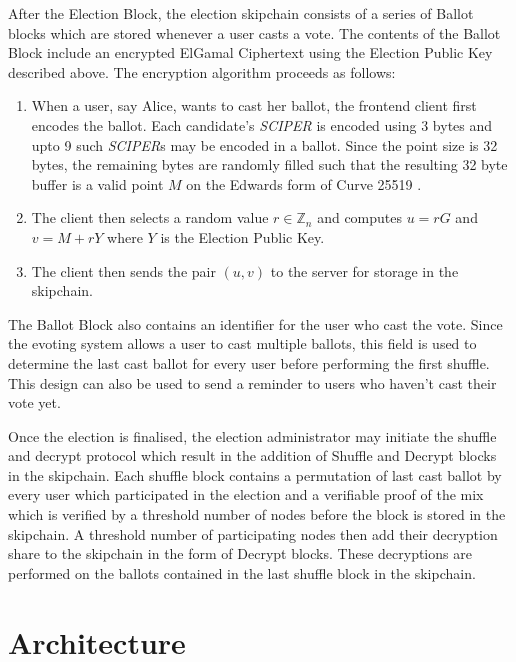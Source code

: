 After the Election Block, the election skipchain consists of a series of Ballot blocks which are stored whenever a user casts a vote. The contents of the Ballot Block include an encrypted ElGamal Ciphertext using the Election Public Key described above.  The encryption algorithm proceeds as follows:

\begin{enumerate}
  \item When a user, say Alice, wants to cast her ballot, the frontend client first encodes the ballot. Each candidate's \textit{SCIPER} is encoded using 3 bytes and upto 9 such \textit{SCIPER}s may be encoded in a ballot. Since the point size is 32 bytes, the remaining bytes are randomly filled such that the resulting 32 byte buffer is a valid point $M$ on the Edwards form of Curve 25519 \cite{ed25519}.
  \item The client then selects a random value \( r \in \mathbb{Z}_{n} \) and computes \( u = rG \) and \( v = M + rY \) where $Y$ is the Election Public Key.
  \item The client then sends the pair \( (u, v) \) to the server for storage in the skipchain.
\end{enumerate}

The Ballot Block also contains an identifier for the user who cast the vote. Since the evoting system allows a user to cast multiple ballots, this field is used to determine the last cast ballot for every user before performing the first shuffle. This design can also be used to send a reminder to users who haven't cast their vote yet.

Once the election is finalised, the election administrator may initiate the shuffle and decrypt protocol which result in the addition of Shuffle and Decrypt blocks in the skipchain. Each shuffle block contains a permutation of last cast ballot by every user which participated in the election and a verifiable proof of the mix which is verified by a threshold number of nodes before the block is stored in the skipchain. A threshold number of participating nodes then add their decryption share to the skipchain in the form of Decrypt blocks. These decryptions are performed on the ballots contained in the last shuffle block in the skipchain.

\section{Architecture}

